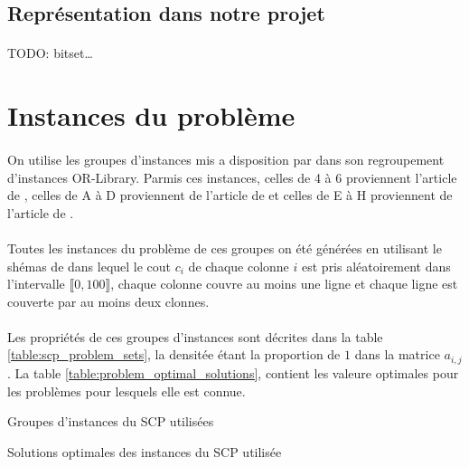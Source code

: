 \documentclass[12pt,letterpaper,twoside]{article}
\begin{document}
		\subsection{Représentation dans notre projet}
			\paragraph*{}
				TODO: bitset\ldots
	\section{Instances du problème}
		\paragraph*{}
			On utilise les groupes d'instances mis a disposition par \citeauthor{OR-Library} dans son regroupement d'instances OR-Library\cite{OR-Library}. Parmis ces instances, celles de 4 à 6 proviennent l'article \cite{Balas1980} de \citeauthor{Balas1980}, celles de A à D proviennent de l'article \cite{Beasley1987} de \citeauthor{Beasley1987} et celles de E à H proviennent de l'article \cite{Beasley1990} de \citeauthor{Beasley1990}.
		\paragraph*{}
			Toutes les instances du problème de ces groupes on été générées en utilisant le shémas de \citeauthor{Balas1980}\cite{Balas1980} dans lequel le cout \(c_i\) de chaque colonne \(i\) est pris aléatoirement dans l'intervalle \(\llbracket0,100\rrbracket\), chaque colonne couvre au moins une ligne et chaque ligne est couverte par au moins deux clonnes.
		\paragraph*{}
		   Les propriétés de ces groupes d'instances sont décrites dans la table \ref{table:scp_problem_sets}, la densitée étant la proportion de \(1\) dans la matrice \(a_{i,j}\). La table \ref{table:problem_optimal_solutions}, contient les valeure optimales pour les problèmes pour lesquels elle est connue.
		\begin{table}[H]
			\centering
			
			\caption{Groupes d'instances du SCP utilisées\cite{OR-Library,Balas1980,Beasley1987,Beasley1990}}
			\label{table:scp_problem_sets}
		\end{table}
		\begin{table}[H]
			\centering
			\begin{minipage}[t]{0.45\linewidth}
				\centering
				
			\end{minipage}
			\begin{minipage}[t]{0.45\linewidth}
				\centering
				
			\end{minipage}
			\caption{Solutions optimales des instances du SCP utilisée\cite{Beasley1990}}
			\label{table:problem_optimal_solutions}
		\end{table}
\end{document}
